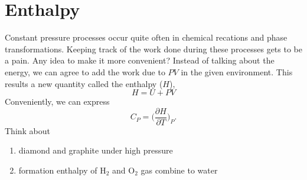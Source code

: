 \documentclass[twoside]{article}
\begin{document}
\section{Enthalpy}
Constant pressure processes occur quite often in chemical recations and phase transformations. Keeping track of the work done during these processes gets to be a pain. Any idea to make it more convenient? Instead of talking about the energy, we can agree to add the work due to $PV$ in the given environment. This results a new quantity called the enthalpy ($H$),
\begin{equation} H = U + PV \end{equation}
Conveniently, we can express 
\begin{equation} C_P = \bigg (\frac {\partial H}{\partial T} \bigg)_{P}.
\end{equation}
Think about
\begin{enumerate}
\item{diamond and graphite under high pressure}
\item{formation enthalpy of H$_2$ and O$_2$ gas combine to water}
\end{enumerate}
\end{document}
